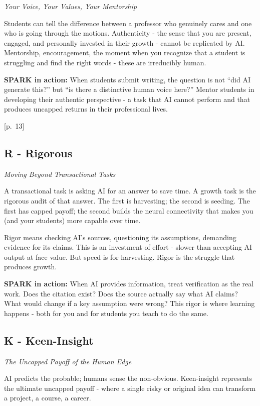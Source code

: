 \documentclass[
  letterpaper,
  DIV=11,
  numbers=noendperiod]{scrreprt}
\begin{document}
\emph{Your Voice, Your Values, Your Mentorship}

Students can tell the difference between a professor who genuinely cares
and one who is going through the motions. Authenticity - the sense that
you are present, engaged, and personally invested in their growth -
cannot be replicated by AI. Mentorship, encouragement, the moment when
you recognize that a student is struggling and find the right words -
these are irreducibly human.

\textbf{SPARK in action:} When students submit writing, the question is
not ``did AI generate this?'' but ``is there a distinctive human voice
here?'' Mentor students in developing their authentic perspective - a
task that AI cannot perform and that produces uncapped returns in their
professional lives.

{[}p.~13{]}

\subsection{R - Rigorous}\label{r---rigorous}

\emph{Moving Beyond Transactional Tasks}

A transactional task is asking AI for an answer to save time. A growth
task is the rigorous audit of that answer. The first is harvesting; the
second is seeding. The first has capped payoff; the second builds the
neural connectivity that makes you (and your students) more capable over
time.

Rigor means checking AI's sources, questioning its assumptions,
demanding evidence for its claims. This is an investment of effort -
slower than accepting AI output at face value. But speed is for
harvesting. Rigor is the struggle that produces growth.

\textbf{SPARK in action:} When AI provides information, treat
verification as the real work. Does the citation exist? Does the source
actually say what AI claims? What would change if a key assumption were
wrong? This rigor is where learning happens - both for you and for
students you teach to do the same.

\subsection{K - Keen-Insight}\label{k---keen-insight}

\emph{The Uncapped Payoff of the Human Edge}

AI predicts the probable; humans sense the non-obvious. Keen-insight
represents the ultimate uncapped payoff - where a single risky or
original idea can transform a project, a course, a career.
\end{document}
